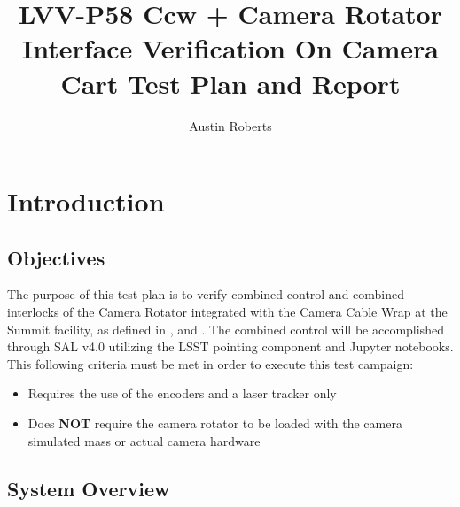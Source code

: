 \documentclass[SE,lsstdraft,STR,toc]{lsstdoc}
\providecommand{\tightlist}{
  \setlength{\itemsep}{0pt}\setlength{\parskip}{0pt}}
\begin{document}
\def\milestoneName{Ccw + Camera Rotator Interface Verification On Camera Cart}
\def\milestoneId{LVV-P58}
\def\product{SIT-COM Integration}


\title{ LVV-P58 Ccw + Camera Rotator Interface Verification On Camera Cart Test Plan and Report}
\setDocRef{\lsstDocType-\lsstDocNum}
\date{\vcsdate}
\author{ Austin Roberts }






\maketitle

\section{Introduction}
\label{sect:intro}


\subsection{Objectives}
\label{sect:objectives}

The purpose of this test plan is to verify combined control and combined
interlocks of the Camera Rotator integrated with the Camera Cable Wrap
at the Summit facility, as defined in ,  and . The
combined control will be accomplished through SAL v4.0 utilizing the
LSST pointing component and Jupyter notebooks. This following criteria
must be met in order to execute this test campaign:

\begin{itemize}
\tightlist
\item
  Requires the use of the encoders and a laser tracker only
\item
  Does \textbf{NOT} require the camera rotator to be loaded with the
  camera simulated mass or actual camera hardware
\end{itemize}



\subsection{System Overview}
\label{sect:systemoverview}
\end{document}
